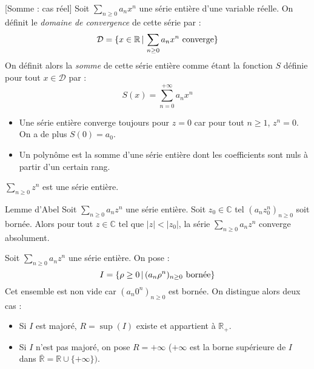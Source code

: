 \documentclass[french,11pt,twoside]{VcCours}
\begin{document}
  \begin{Definition}{}[Somme : cas réel] Soit $\sum_{n \geq 0} a_n x^n$ une série entière d'une variable réelle. On définit le \emph{domaine de convergence} de cette série par :
 $$ \mathcal{D} = \lbrace x \in \mathbb{R} \, \vert \,  \sum_{n \geq 0} a_n x^n \hbox{ converge} \rbrace$$
 On définit alors la \emph{somme} de cette série entière comme étant la fonction $S$ définie pour tout $x \in \mathcal{D}$ par :
 $$ S(x) = \sum_{n=0}^{+ \infty} a_n x^n$$
 \end{Definition}
 
 \begin{Remarques}{}
\begin{itemize} 
 \item Une série entière converge toujours pour $z=0$ car pour tout $n \geq 1$, $z^n=0$. On a de plus $S(0)=a_0$.
 \item Un polynôme est la somme d'une série entière dont les coefficients sont nuls à partir d'un certain rang.
 \end{itemize}
\end{Remarques}

\begin{Exemple}{} $\sum_{n \geq 0} z^n$ est une série entière. 

\end{Exemple}

\newpage

\begin{Theoreme}{Lemme d'Abel}
Soit $\sum_{n \geq 0} a_n z^n$ une série entière. 
Soit $z_0 \in \mathbb{C}$ tel $(a_n z_0^n)_{n \geq 0}$ soit bornée. 
Alors pour tout $z \in \mathbb{C}$ tel que $\vert z \vert < \vert z_0 \vert$, la série $\sum_{n \geq 0} a_n z^n$ converge absolument.
\end{Theoreme}

\begin{Demonstration}{}

    \vspace*{ 7cm}
\end{Demonstration}

Soit $\sum_{n \geq 0} a_n z^n$ une série entière. On pose :
$$ I = \lbrace \rho \geq 0 \, \vert \, (a_n \rho^n)_{n \geq 0} \hbox{ bornée}\rbrace $$
Cet ensemble est non vide car $(a_n 0^n)_{n \geq 0}$ est bornée. On distingue alors deux cas :
\begin{itemize}
\item Si $I$ est majoré, $R = \sup(I)$ existe et appartient à $\mathbb{R}_+$.
\item Si $I$ n'est pas majoré, on pose $R= + \infty$ ($+ \infty$ est la borne supérieure de $I$ dans $\overline{\mathbb{R}} = \mathbb{R} \cup \lbrace + \infty \rbrace)$.
\end{itemize}
\end{document}
